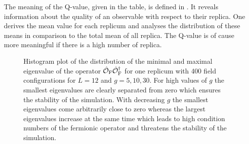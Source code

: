 %
%
%

%
%
%
The meaning of the Q-value, given in the table, is defined in \cite{Wolff:2003sm}. It reveals information about the quality of an observable with respect to their replica. One derives the mean value for each replicum and analyses the distribution of these means in comparison to the total mean of all replica. The Q-value is of cause more meaningful if there is a high number of replica. \\
%
\begin{figure}
\centering

\hspace{0.2cm}

\caption{Histogram plot of the distribution of the minimal and maximal eigenvalue of the operator $\hat{\mathcal{O}}_{\rm F}\hat{\mathcal{O}}_{\rm F}^{\dagger}$ for one replicum with 400 field configurations for $L=12$ and $g=5,10,30$. For high values of $g$ the smallest eigenvalues are clearly separated from zero which ensures the stability of the simulation. With decreasing $g$ the smallest eigenvalues come arbitrarily close to zero whereas the largest eigenvalues increase at the same time which leads to high condition numbers of the fermionic operator and threatens the stability of the simulation. \label{fig: ev_dist}}
\end{figure}
%

